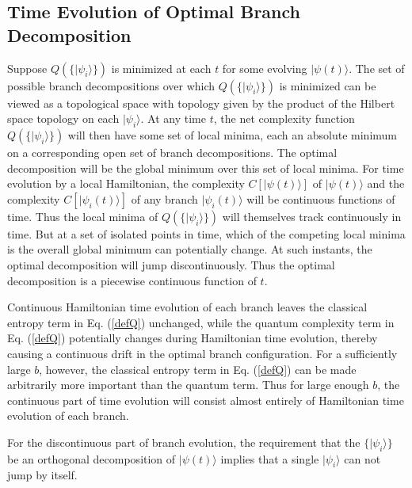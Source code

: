 \documentclass[twocolumn,amsmath,amssymb]{revtex4-1}
\begin{document}
\subsection{\label{subsec:timeevolution} Time Evolution of Optimal Branch Decomposition}


Suppose $Q(\{|\psi_i \rangle \})$ is minimized at each $t$ for
some evolving $|\psi(t) \rangle $.
The set of possible 
branch decompositions over which $Q(\{|\psi_i \rangle \})$ is
minimized can be viewed as a topological space with
topology given by the product of
the Hilbert space topology on each $|\psi_i \rangle $.
At any time $t$,
the net complexity function $Q(\{|\psi_i \rangle \})$ will then have
some set of local minima, each an absolute minimum on
a corresponding open set of branch decompositions.
The optimal
decomposition will be the global minimum over this
set of local minima. 
For time evolution by a  local Hamiltonian,
the complexity $C[|\psi(t) \rangle ]$ of $|\psi(t) \rangle $ and the complexity $C[|\psi_i(t) \rangle ]$ of
any branch $|\psi_i(t) \rangle $ will be continuous functions of time.
Thus the local minima of $Q(\{|\psi_i \rangle \})$ will
themselves track continuously in time.
But at a
set of isolated points in time, which of the competing
local minima is the overall global minimum can potentially change.
At such instants, the optimal decomposition
will jump discontinuously. Thus the optimal decomposition
is a piecewise continuous function of $t$.

Continuous Hamiltonian time evolution of each branch
leaves the classical entropy term in Eq. (\ref{defQ}) unchanged,
while the quantum complexity term in Eq. (\ref{defQ}) potentially changes 
during Hamiltonian time evolution, thereby causing a continuous drift in
the optimal branch configuration.
For a sufficiently large $b$, however, the classical
entropy term in Eq. (\ref{defQ}) can be made arbitrarily more important than
the quantum term.
Thus for large enough $b$, the continuous part of time evolution
will consist almost entirely of Hamiltonian time evolution of each branch.

For the discontinuous part of branch evolution,
the requirement that the $\{ |\psi_i \rangle  \}$ be an orthogonal
decomposition of $|\psi(t) \rangle $ implies that a single $|\psi_i \rangle $
can not jump by itself.
\end{document}

